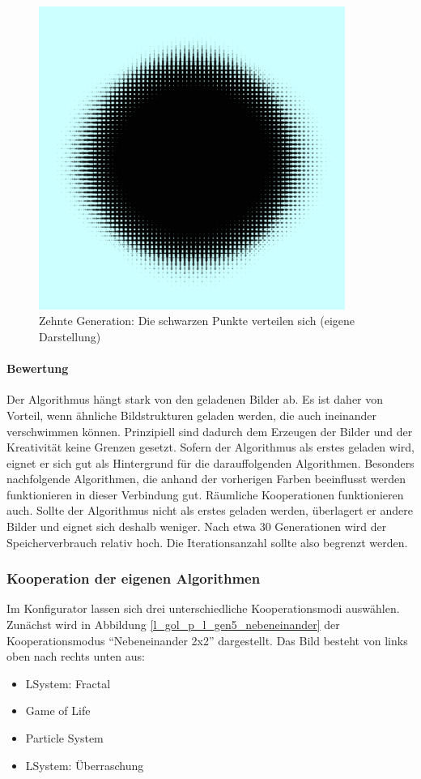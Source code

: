\documentclass[../mciAusarbeitung.tex]{subfiles}
\begin{document}
\begin{figure}[H]
\includegraphics[width=10cm]{img/all_black.png}
\caption{Zehnte Generation: Die schwarzen Punkte verteilen sich (eigene Darstellung)}
\label{all_black}
\end{figure}

\paragraph{Bewertung}
Der Algorithmus hängt stark von den geladenen Bilder ab. Es ist daher von Vorteil, wenn ähnliche Bildstrukturen geladen werden, die auch ineinander verschwimmen können. Prinzipiell sind dadurch dem Erzeugen der Bilder und der Kreativität keine Grenzen gesetzt. 
Sofern der Algorithmus als erstes geladen wird, eignet er sich gut als Hintergrund für die darauffolgenden Algorithmen. Besonders nachfolgende Algorithmen, die anhand der vorherigen Farben beeinflusst werden funktionieren in dieser Verbindung gut. Räumliche Kooperationen funktionieren auch. Sollte der Algorithmus nicht als erstes geladen werden, überlagert er andere Bilder und eignet sich deshalb weniger. Nach etwa 30 Generationen wird der Speicherverbrauch relativ hoch. Die Iterationsanzahl sollte also begrenzt werden.

\subsubsection{Kooperation der eigenen Algorithmen}
Im Konfigurator lassen sich drei unterschiedliche Kooperationsmodi auswählen. Zunächst wird in Abbildung \ref{l_gol_p_l_gen5_nebeneinander} der Kooperationsmodus "`Nebeneinander 2x2"' dargestellt. Das Bild besteht von links oben nach rechts unten aus:
\begin{itemize}
\item LSystem: Fractal
\item Game of Life
\item Particle System
\item LSystem: Überraschung
\end{itemize}
\end{document}

